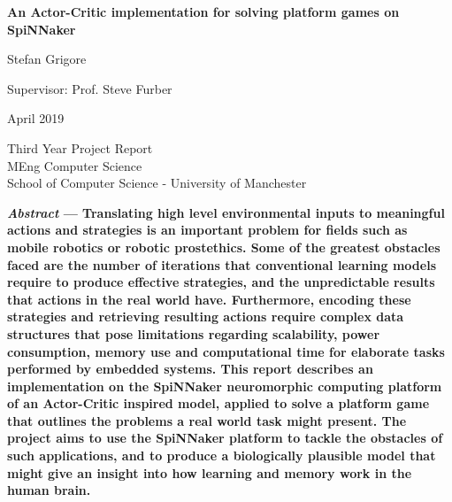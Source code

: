 \documentclass[10pt]{article}
\begin{document}
    
    \begin{titlepage}
        \begin{center}
        \vspace*{1cm}
    
        \Large
        \textbf{An Actor-Critic implementation for solving platform games on SpiNNaker}
    
        \vspace{0.5cm}
            Stefan Grigore
    
        \vspace{0.5cm} 
        
            Supervisor: Prof. Steve Furber

        \vspace{0.5cm} 

            April 2019
    
        \vspace{1.5cm}

        \vfill

        Third Year Project Report \\
        MEng Computer Science \\
        School of Computer Science - University of Manchester
     
        \end{center}
    \end{titlepage}

    \twocolumn
    
    \textbf{\textit{Abstract} --- Translating high level environmental inputs to meaningful actions and strategies is an important problem for fields such as mobile robotics or robotic prostethics. Some of the greatest obstacles faced are the number of iterations that conventional learning models require to produce effective strategies, and the unpredictable results that actions in the real world have. Furthermore, encoding these strategies and retrieving resulting actions require complex data structures that pose limitations regarding scalability, power consumption, memory use and computational time for elaborate tasks performed by embedded systems. This report describes an implementation on the SpiNNaker neuromorphic computing platform of an Actor-Critic inspired model, applied to solve a platform game that outlines the problems a real world task might present. The project aims to use the SpiNNaker platform to tackle the obstacles of such applications, and to produce a biologically plausible model that might give an insight into how learning and memory work in the human brain.}
\end{document}
